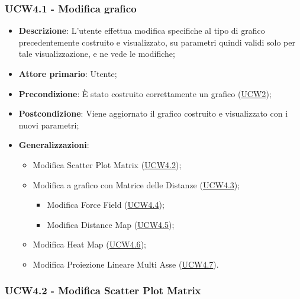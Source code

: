 \newpage
\subsubsection{UCW4.1 - Modifica grafico}
\label{ssub:ucw4.1}

\begin{itemize}
    \item \textbf{Descrizione}: L’utente effettua modifica specifiche al tipo di grafico precedentemente costruito e visualizzato,
                                su parametri quindi validi solo per tale visualizzazione, e ne vede le modifiche;

    \item \textbf{Attore primario}: Utente;

    \item \textbf{Precondizione}:   È stato costruito correttamente un grafico (\hyperref[sub:ucw2]{UCW2});

    \item \textbf{Postcondizione}:  Viene aggiornato il grafico costruito e visualizzato con i nuovi parametri;

    \item \textbf{Generalizzazioni}:
        \begin{itemize}
            \item Modifica Scatter Plot Matrix (\hyperref[ssub:ucw4.2]{UCW4.2});
            \item Modifica a grafico con Matrice delle Distanze (\hyperref[ssub:ucw4.3]{UCW4.3});
            \begin{itemize}
                \item Modifica Force Field (\hyperref[ssub:ucw4.4]{UCW4.4});
                \item Modifica Distance Map (\hyperref[ssub:ucw4.5]{UCW4.5});
             \end{itemize}
            \item Modifica Heat Map (\hyperref[ssub:ucw4.6]{UCW4.6});
            \item Modifica Proiezione Lineare Multi Asse (\hyperref[ssub:ucw4.7]{UCW4.7}).
        \end{itemize}
\end{itemize}

\subsubsection{UCW4.2 - Modifica Scatter Plot Matrix}
\label{ssub:ucw4.2}

